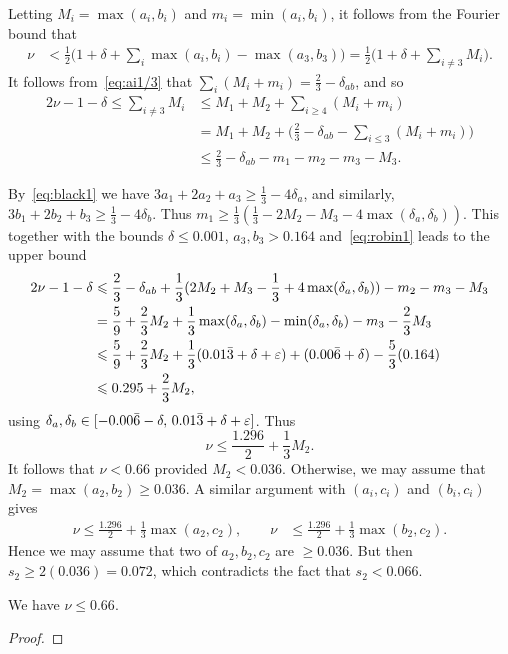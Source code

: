 Letting $M_i = \max(a_i, b_i)$ and $m_i = \min(a_i, b_i)$, it follows from the Fourier bound that
\begin{align*}
\nu &< \frac{1}{2}\Big(1+\delta+\sum_{i}\max(a_i, b_i) - \max(a_3,b_3)\Big) = \frac{1}{2}\Big(1+\delta+\sum_{i\neq3}M_i\Big).
\end{align*}
It follows from~\eqref{eq:ai1/3} that
$\sum_i (M_i+m_i)=\frac{2}{3}-\delta_{ab}$, and so
\begin{align*}
2\nu-1 -\delta\le \sum_{i\neq3}M_i
&\le M_1+M_2 + \sum_{i\ge4}(M_i+m_i)\\
&= M_1+M_2 + \Big(\frac{2}{3} - \delta_{ab} - \sum_{i\le3}(M_i+m_i)\Big)\\
& \le \frac{2}{3} - \delta_{ab} - m_1 - m_2 - m_3 - M_3.
\end{align*}


By~\eqref{eq:black1} we have $3a_1 + 2a_2 + a_3 \ge \frac{1}{3}-4\delta_a$, and similarly,
$3b_1 + 2b_2 +b_3 \ge \frac{1}{3}-4\delta_b$. Thus $m_1 \ge \frac{1}{3}(\frac{1}{3}-2M_2 - M_3-4\max(\delta_a,\delta_b))$.
This together with the bounds $\delta\leq 0.001$, $a_3,b_3>0.164$ and~\eqref{eq:robin1} leads to the upper bound
\begin{align*}
2\nu-1 -\delta
& \leqslant \frac{2}{3}
-\delta_{ab}
+ \frac{1}{3}(2M_2 + M_3-\frac{1}{3}+4\max(\delta_a,\delta_b)) - m_2 - m_3 - M_3 \\
& = \frac{5}{9} + \frac{2}{3}M_2
+\frac{1}{3}\max(\delta_a,\delta_b)- \min(\delta_a,\delta_b)
- m_3 - \frac{2}{3}M_3 \\
&\leqslant \frac{5}{9} + \frac{2}{3}M_2+
\frac{1}{3}(0.01\bar{3}+\delta+\varepsilon) + (0.00\bar{6}+\delta)
- \frac{5}{3}(0.164)\\
&\leqslant 0.295+\frac{2}{3}M_2,
\end{align*}
using $\delta_a,\delta_b\in [-0.00\bar{6}-\delta,\, 0.01\bar{3}+\delta+\varepsilon]$.
Thus
\[
\nu\leq \frac{1.296}{2}+\frac{1}{3}M_2.
\]
It follows that
 $\nu< 0.66$ provided $M_2 < 0.036$.
 Otherwise, we may assume that $M_2=\max(a_2,b_2) \geq 0.036$.
A similar argument with $(a_i,c_i)$ and $(b_i,c_i)$ gives
\begin{align*}
\nu
 \leq \frac{1.296}{2}+\frac{1}{3}\max(a_2,c_2),\qquad
\nu & \leq \frac{1.296}{2}+ \frac{1}{3}\max(b_2,c_2).
\end{align*}
Hence we may assume that two of $a_2,b_2,c_2$ are $\geq 0.036$. But then $s_2 \geq 2( 0.036) = 0.072$, which contradicts the fact that $s_2< 0.066$.

\begin{theorem} \label{thm:ABCExponentNu}
We have $\nu \le 0.66$.
\end{theorem}
\begin{proof}
\end{proof}


